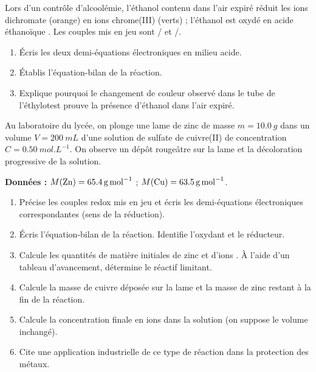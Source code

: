 \documentclass[11pt]{article}
\newcounter{popsec}
\newcounter{popsub}
\newcommand{\courssub}[1]{%
  \stepcounter{popsub}%
  \par\vspace{9pt}\noindent{\popxbold\fontsize{11.5}{13}\selectfont\color{popink}{\color{poporange}\thepopsec.\thepopsub}\hspace{6pt}#1}\par\nopagebreak\vspace{4pt}
}
\begin{document}
\begin{exercice}[L'éthylotest]
Lors d'un contrôle d'alcoolémie, l'éthanol  contenu dans l'air expiré réduit les ions dichromate  (orange) en ions chrome(III)  (verts) ; l'éthanol est oxydé en acide éthanoïque . Les couples mis en jeu sont / et /.
\begin{enumerate}
\item Écris les deux demi-équations électroniques en milieu acide.
\item Établis l'équation-bilan de la réaction.
\item Explique pourquoi le changement de couleur observé dans le tube de l'éthylotest prouve la présence d'éthanol dans l'air expiré.
\end{enumerate}
\end{exercice}

\courssub{Je me prépare au Bac}

\begin{exercice}
Au laboratoire du lycée, on plonge une lame de zinc de masse $m = \SI{10,0}{g}$ dans un volume $V = \SI{200}{mL}$ d'une solution de sulfate de cuivre(II) de concentration $C = \SI{0,50}{mol.L^{-1}}$. On observe un dépôt rougeâtre sur la lame et la décoloration progressive de la solution.

\textbf{Données :} $M(\ce{Zn}) = \SI{65,4}{g.mol^{-1}}$ ; $M(\ce{Cu}) = \SI{63,5}{g.mol^{-1}}$.

\begin{enumerate}
\item Précise les couples redox mis en jeu et écris les demi-équations électroniques correspondantes (sens de la réduction).
\item Écris l'équation-bilan de la réaction. Identifie l'oxydant et le réducteur.
\item Calcule les quantités de matière initiales de zinc et d'ions . À l'aide d'un tableau d'avancement, détermine le réactif limitant.
\item Calcule la masse de cuivre déposée sur la lame et la masse de zinc restant à la fin de la réaction.
\item Calcule la concentration finale en ions  dans la solution (on suppose le volume inchangé).
\item Cite une application industrielle de ce type de réaction dans la protection des métaux.
\end{enumerate}
\end{exercice}
\end{document}
